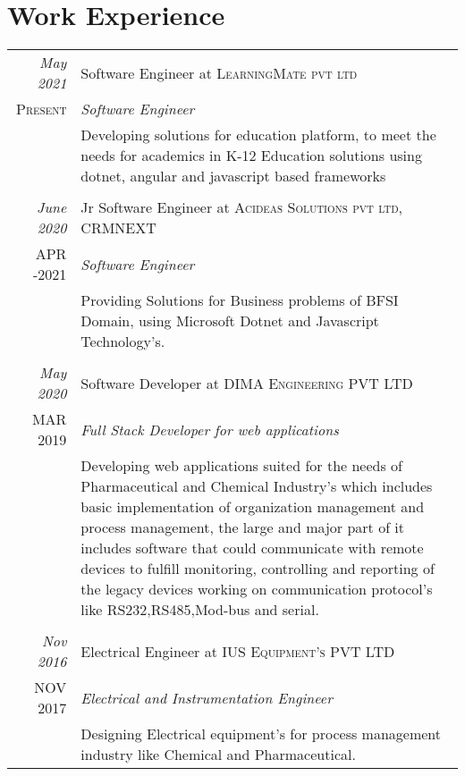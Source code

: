 \section{Work Experience}
\begin{tabular}{r|p{11cm}}


\emph{May 2021} &  Software Engineer at \textsc{LearningMate pvt ltd} \\\textsc{Present}&\emph{Software Engineer }\\&\footnotesize{ Developing solutions for education platform, to meet the needs for academics in  K-12 Education solutions using dotnet, angular and javascript based frameworks }\\\multicolumn{2}{c}{} \\

\emph{June 2020} & Jr Software Engineer at \textsc{Acideas Solutions pvt ltd, CRMNEXT} \\\textsc{APR -2021}&\emph{Software Engineer }\\&\footnotesize{ Providing Solutions for Business problems of BFSI Domain, using Microsoft Dotnet and Javascript  Technology's. }\\\multicolumn{2}{c}{} \\

 \emph{May 2020} & Software Developer at \textsc{DIMA Engineering PVT LTD} \\\textsc{MAR 2019}&\emph{Full Stack Developer for web applications}\\&\footnotesize{ Developing web applications suited for the needs of Pharmaceutical and Chemical Industry's which includes basic implementation of organization management and process management, the large and major part of it includes software that could communicate with remote devices to fulfill monitoring, controlling and reporting of the legacy devices working on communication protocol's like RS232,RS485,Mod-bus and serial. }\\\multicolumn{2}{c}{} \\
 
 \emph{Nov 2016} & Electrical Engineer at \textsc{IUS Equipment's PVT LTD} \\\textsc{NOV 2017}&\emph{Electrical and Instrumentation Engineer}\\&\footnotesize{Designing Electrical equipment's for process management industry like Chemical and Pharmaceutical. }
\end{tabular}






